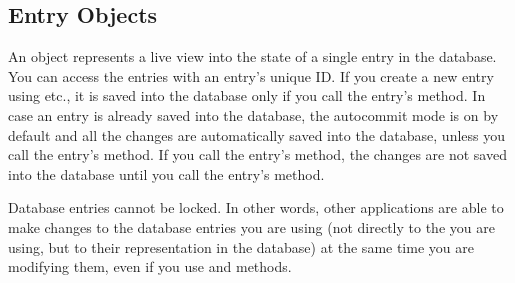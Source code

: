 \subsection{Entry Objects}
\label{subsec:entry}

An  object represents a live view into the state of a single 
entry in the database. You can access the entries with an entry's unique ID. 
If you create a new entry using  etc., it is 
saved into the database only if you call the entry's  method. 
In case an entry is already saved into the database, the autocommit mode is 
on by default and all the changes are automatically saved into the database, 
unless you call the entry's  method. If you call the entry's 
 method, the changes are not saved into the database until you 
call the entry's  method. 

Database entries cannot be locked. In other words, other applications are 
able to make changes to the database entries you are using (not directly to 
the  you are using, but to their representation in the 
database) at the same time you are modifying them, even if you use 
 and  methods. 


